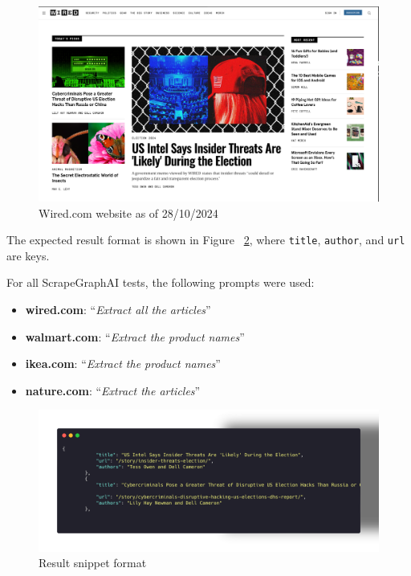 \begin{figure}[h!]
    \centering
    \includegraphics[width=0.95\linewidth]{Assets/wired.png}
    \caption{Wired.com website as of 28/10/2024}
    \label{fig:enter-label}
\end{figure}

The expected result format is shown in Figure ~\ref{fig:res-snippet}, where \texttt{title}, \texttt{author}, and \texttt{url} are keys.

For all ScrapeGraphAI tests, the following prompts were used:

\begin{itemize}
    \item \textbf{wired.com}: ``\textit{Extract all the articles}''
    \item \textbf{walmart.com}: ``\textit{Extract the product names}''
    \item \textbf{ikea.com}: ``\textit{Extract the product names}''
    \item \textbf{nature.com}: ``\textit{Extract the articles}''
\end{itemize}

\begin{figure}[h!]
    \centering
    \includegraphics[width=0.95\linewidth]{Assets/result.png}
    \caption{Result snippet format}
    \label{fig:res-snippet}
\end{figure}

